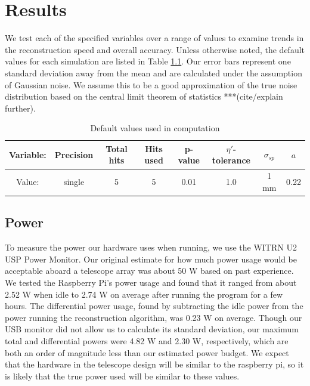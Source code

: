 \chapter{Results}
We test each of the specified variables over a range of values to examine trends in the reconstruction speed and overall accuracy. Unless otherwise noted, the default values for each simulation are listed in Table \ref{tab:def_vals}. Our error bars represent one standard deviation away from the mean and are calculated under the assumption of Gaussian noise. We assume this to be a good approximation of the true noise distribution based on the central limit theorem of statistics ***(cite/explain further).\\

\begin{table}[h]
    \centering
    \begin{tabular}{|c|c|c|c|c|c|c|c|}
    \hline
    Variable: & Precision & Total hits & Hits used & p-value & $\eta'$-tolerance & $\sigma_{sp}$ & $a$ \\
    \hline
    Value: & single & 5 & 5 & 0.01 & 1.0 & 1 mm & 0.22 \\
    \hline
    \end{tabular}
    \caption{Default values used in computation}
    \label{tab:def_vals}
\end{table}

\section{Power}
To measure the power our hardware uses when running, we use the WITRN U2 USP Power Monitor\cite{WITRN}. Our original estimate for how much power usage would be acceptable aboard a telescope array was about 50 W based on past experience. We tested the Raspberry Pi's power usage and found that it ranged from about 2.52 W when idle to 2.74 W on average after running the program for a few hours. The differential power usage, found by subtracting the idle power from the power running the reconstruction algorithm, was 0.23 W on average. Though our USB monitor did not allow us to calculate its standard deviation, our maximum total and differential powers were 4.82 W and 2.30 W, respectively, which are both an order of magnitude less than our estimated power budget. We expect that the hardware in the telescope design will be similar to the raspberry pi, so it is likely that the true power used will be similar to these values.

